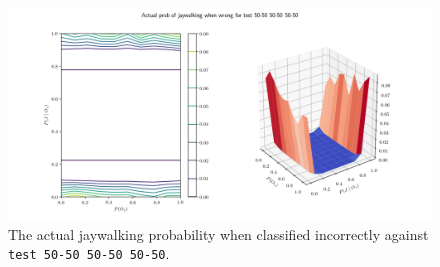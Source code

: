 \documentclass[paper=a4paper]{report}
\newcommand{\code}{\texttt}
\begin{document}
\begin{figure}[h]
    \centering
    \centerline{\includegraphics[scale=0.55]{test_50-50_50-50_50-50_jay_prob.png}}
    \caption[]{The actual jaywalking probability when classified incorrectly against \code{test 50-50 50-50 50-50}.}
    \label{fig:test_50-50_50-50_50-50_jay_prob_plot}
\end{figure}
\end{document}
